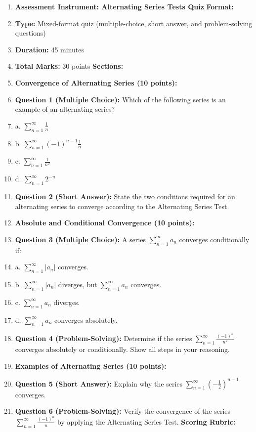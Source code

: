 \begin{enumerate}
    \item \textbf{Assessment Instrument: Alternating Series Tests Quiz} \textbf{Format:}
    \item \textbf{Type:} Mixed-format quiz (multiple-choice, short answer, and problem-solving questions)
    \item \textbf{Duration:} 45 minutes
    \item \textbf{Total Marks:} 30 points \textbf{Sections:}
    \item \textbf{Convergence of Alternating Series (10 points):}
    \item \textbf{Question 1 (Multiple Choice):} Which of the following series is an example of an alternating series?
    \item a. $\sum_{n=1}^\infty \frac{1}{n}$
    \item b. $\sum_{n=1}^\infty (-1)^{n-1} \frac{1}{n}$
    \item c. $\sum_{n=1}^\infty \frac{1}{n^2}$
    \item d. $\sum_{n=1}^\infty 2^{-n}$
    \item \textbf{Question 2 (Short Answer):} State the two conditions required for an alternating series to converge according to the Alternating Series Test.
    \item \textbf{Absolute and Conditional Convergence (10 points):}
    \item \textbf{Question 3 (Multiple Choice):} A series $\sum_{n=1}^\infty a_n$ converges conditionally if:
    \item a. $\sum_{n=1}^\infty |a_n|$ converges.
    \item b. $\sum_{n=1}^\infty |a_n|$ diverges, but $\sum_{n=1}^\infty a_n$ converges.
    \item c. $\sum_{n=1}^\infty a_n$ diverges.
    \item d. $\sum_{n=1}^\infty a_n$ converges absolutely.
    \item \textbf{Question 4 (Problem-Solving):} Determine if the series $\sum_{n=1}^\infty \frac{(-1)^n}{n^2}$ converges absolutely or conditionally. Show all steps in your reasoning.
    \item \textbf{Examples of Alternating Series (10 points):}
    \item \textbf{Question 5 (Short Answer):} Explain why the series $\sum_{n=1}^\infty \left(-\frac{1}{2}\right)^{n-1}$ converges.
    \item \textbf{Question 6 (Problem-Solving):} Verify the convergence of the series $\sum_{n=1}^\infty \frac{(-1)^n}{n}$ by applying the Alternating Series Test. \textbf{Scoring Rubric:}

\end{enumerate}

